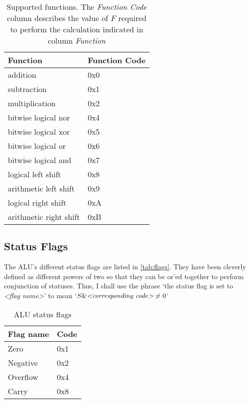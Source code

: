 \documentclass{article}
\begin{document}
\begin{table}[htbp]
  \centering
  \begin{tabular}{|l|l|}
    \hline
    {\bf Function}         & {\bf Function Code} \\ \hline
    addition               & 0x0 \\ \hline
    subtraction            & 0x1 \\ \hline
    multiplication         & 0x2 \\ \hline
    bitwise logical nor    & 0x4 \\ \hline
    bitwise logical xor    & 0x5 \\ \hline
    bitwise logical or     & 0x6 \\ \hline
    bitwise logical and    & 0x7 \\ \hline
    logical left shift     & 0x8 \\ \hline
    arithmetic left shift  & 0x9 \\ \hline
    logical right shift    & 0xA \\ \hline
    arithmetic right shift & 0xB \\ \hline

  \end{tabular}
  \caption{Supported functions. The \emph{Function Code} column describes the value of $F$ required to perform the calculation indicated in column \emph{Function}}
  \label{tab:functions}
\end{table}

\subsection{Status Flags}
\label{subsec:flags}
The ALU's different status flags are listed in \autoref{tab:flags}. They have been cleverly defined as different powers of two so that they can be or'ed together to perform conjunction of statuses. Thus, I shall use the phrase `the status flag is set to \emph{\textless{}flag name\textgreater{}}' to mean `$S \& \emph{\textless{}corresponding code\textgreater{}} \neq 0$'
\begin{table}[htbp]
  \centering
  \begin{tabular}{|l|l|}
    \hline
    \textbf{Flag name} & \textbf{Code} \\ \hline
    Zero     & 0x1 \\ \hline
    Negative & 0x2 \\ \hline
    Overflow & 0x4 \\ \hline
    Carry    & 0x8 \\ \hline
  \end{tabular}
  \caption{ALU status flags}
  \label{tab:flags}
\end{table}
\end{document}
